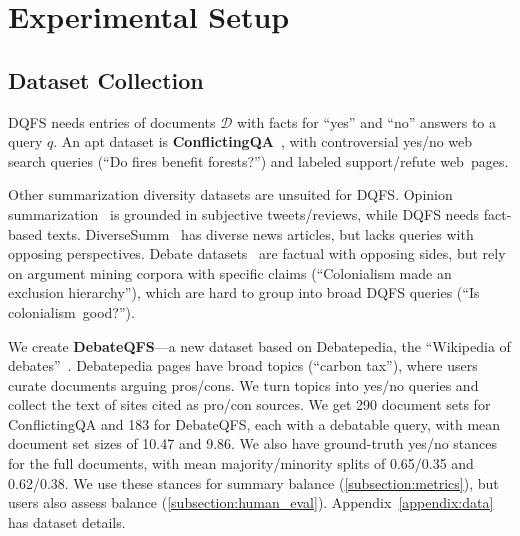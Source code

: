 

\section{Experimental Setup}



\subsection{Dataset Collection} \label{subsection:datasets}

DQFS needs entries of documents $\mathcal{D}$ with facts for ``yes'' and ``no'' answers to a query $q$. An apt dataset is \textbf{ConflictingQA}~\cite{wan2024evidence}, with controversial yes/no web search queries (``Do fires benefit forests?'') and labeled support/refute web~pages.

Other summarization diversity datasets are unsuited for DQFS.
Opinion summarization~\cite{zhang-etal-2024-fair} is grounded in subjective tweets/reviews, while DQFS needs fact-based texts.
DiverseSumm~\cite{huang-etal-2024-embrace} has diverse news articles, but lacks queries with opposing perspectives.
Debate datasets~\cite{roush2024opendebateevidence} are factual with opposing sides, but rely on argument mining corpora with specific claims (``Colonialism made an exclusion hierarchy''), which are hard to group into broad DQFS queries (``Is colonialism~good?'').


We create \textbf{DebateQFS}---a new dataset based on Debatepedia, the ``Wikipedia of debates''~\cite{gottopati2013learning}.
Debatepedia pages have broad topics (``carbon tax''), where users curate documents arguing pros/cons.
We turn topics into yes/no queries and collect the text of sites cited as pro/con sources.
We get 290 document sets for ConflictingQA and 183 for DebateQFS, each with a debatable query, with mean document set sizes of 10.47 and 9.86.
We also have ground-truth yes/no stances for the full documents, with mean majority/minority splits of 0.65/0.35 and 0.62/0.38.
We use these stances for summary balance (\cref{subsection:metrics}), but users also assess balance (\cref{subsection:human_eval}).
Appendix~\ref{appendix:data} has dataset details.

